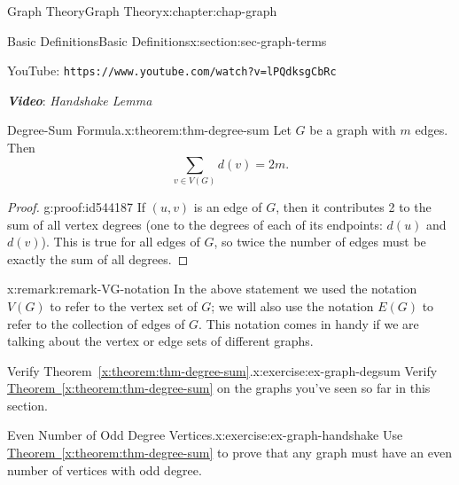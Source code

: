 \documentclass[oneside,10pt,]{book}
\newcommand{\xreffont}{\relax}
\newcommand{\mono}[1]{\texttt{#1}}
\newcommand{\alert}[1]{\textbf{\textit{#1}}}
\numberwithin{equation}{section}
\newlength{\qrsize}
\newlength{\previewwidth}
\begin{document}
\begin{chapterptx}{Graph Theory}{}{Graph Theory}{}{}{x:chapter:chap-graph}
\begin{sectionptx}{Basic Definitions}{}{Basic Definitions}{}{}{x:section:sec-graph-terms}
\begin{sidebyside}{1}{0}{0}{0}
\begin{sbspanel}{1}
\begin{tcbraster}[raster columns=2, raster column skip=1pt, raster halign=center, raster force size=false, raster left skip=0pt, raster right skip=0pt]
\begin{tcolorbox}[previewstyle, width=\previewwidth]
\end{tcolorbox}%
\begin{tcolorbox}[qrstyle]%
{\hypersetup{urlcolor=black}}%
\end{tcolorbox}%
\begin{tcolorbox}[captionstyle]%
\small YouTube: \mono{https://www.youtube.com/watch?v=lPQdksgCbRc}\end{tcolorbox}%
\end{tcbraster}%
\end{sbspanel}%
\end{sidebyside}%
\par
\alert{Video}: \emph{Handshake Lemma}%
\begin{theorem}{Degree-Sum Formula.}{}{x:theorem:thm-degree-sum}%
Let \(G\) be a graph with \(m\) edges. Then%
\begin{equation*}
\sum_{v \in V(G)} d(v) = 2m\text{.}
\end{equation*}
%
\end{theorem}
\begin{proof}{}{g:proof:id544187}
If \((u,v)\) is an edge of \(G\), then it contributes 2 to the sum of all vertex degrees (one to the degrees of each of its endpoints: \(d(u)\) and \(d(v)\)). This is true for all edges of \(G\), so twice the number of edges must be exactly the sum of all degrees.%
\end{proof}
\begin{remark}{}{x:remark:remark-VG-notation}%
In the above statement we used the notation \(V(G)\) to refer to the vertex set of \(G\); we will also use the notation \(E(G)\) to refer to the collection of edges of \(G\). This notation comes in handy if we are talking about the vertex or edge sets of different graphs. \label{g:notation:id544226}\label{g:notation:id544247}%
\end{remark}
\begin{inlineexercise}{Verify Theorem~{\xreffont\ref*{x:theorem:thm-degree-sum}}.}{x:exercise:ex-graph-degsum}%
Verify \hyperref[x:theorem:thm-degree-sum]{Theorem~{\xreffont\ref{x:theorem:thm-degree-sum}}} on the graphs you've seen so far in this section.%
\end{inlineexercise}%
\begin{inlineexercise}{Even Number of Odd Degree Vertices.}{x:exercise:ex-graph-handshake}%
Use \hyperref[x:theorem:thm-degree-sum]{Theorem~{\xreffont\ref{x:theorem:thm-degree-sum}}} to prove that any graph must have an even number of vertices with odd degree.%

\end{inlineexercise}
\end{sectionptx}
\end{chapterptx}
\end{document}
